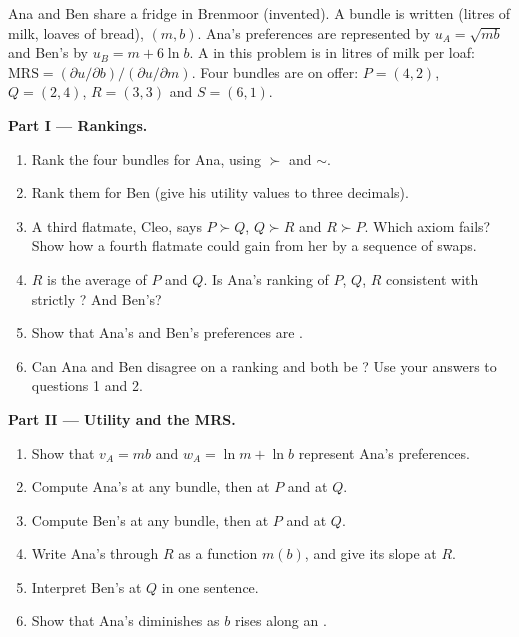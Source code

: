 \begin{problem}\label{pb:b1:preferences-and-utility:fridge}
Ana and Ben share a fridge in Brenmoor (invented). A bundle is written
(litres of milk, loaves of bread), $(m, b)$. Ana's preferences are represented by
$u_A = \sqrt{mb}$ and Ben's by $u_B = m + 6\ln b$. A  in this problem is in litres of milk per loaf:
$\mathrm{MRS} = (\partial u/\partial b)/(\partial u/\partial m)$. Four
bundles are on offer: $P = (4, 2)$, $Q = (2, 4)$, $R = (3, 3)$ and $S = (6, 1)$.

\medskip\noindent\textbf{Part I --- Rankings.}
\begin{enumerate}
  \item Rank the four bundles for Ana, using $\succ$ and $\sim$.
  \item Rank them for Ben (give his utility values to three decimals).
  \item A third flatmate, Cleo, says $P \succ Q$, $Q \succ R$ and $R \succ P$. Which axiom fails? Show how a fourth flatmate could gain from her by a sequence of swaps.
  \item $R$ is the average of $P$ and $Q$. Is Ana's ranking of $P$, $Q$, $R$ consistent with strictly ? And Ben's?
  \item Show that Ana's and Ben's preferences are .
  \item Can Ana and Ben disagree on a ranking and both be ? Use your answers to questions 1 and 2.
\end{enumerate}

\medskip\noindent\textbf{Part II --- Utility and the MRS.}
\begin{enumerate}[resume]
  \item Show that $v_A = mb$ and $w_A = \ln m + \ln b$ represent Ana's preferences.
  \item Compute Ana's  at any bundle, then at $P$ and at $Q$.
  \item Compute Ben's  at any bundle, then at $P$ and at $Q$.
  \item Write Ana's  through $R$ as a function $m(b)$, and give its slope at $R$.
  \item Interpret Ben's  at $Q$ in one sentence.
  \item Show that Ana's  diminishes as $b$ rises along an .
\end{enumerate}


\end{problem}
